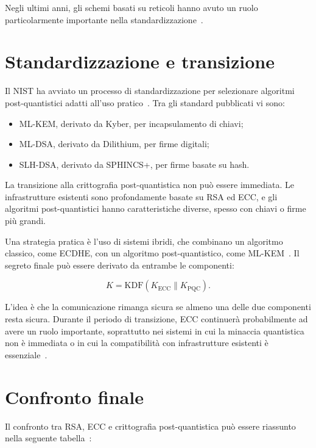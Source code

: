 \documentclass[12pt,a4paper,oneside]{report}
\begin{document}
Negli ultimi anni, gli schemi basati su reticoli hanno avuto un ruolo particolarmente importante nella standardizzazione~\cite{margara_pqc,fips_203,fips_204}.

\section{Standardizzazione e transizione}

Il NIST ha avviato un processo di standardizzazione per selezionare algoritmi post-quantistici adatti all'uso pratico~\cite{margara_pqc,fips_203,fips_204,fips_205}. Tra gli standard pubblicati vi sono:

\begin{itemize}
    \item ML-KEM, derivato da Kyber, per incapsulamento di chiavi;
    \item ML-DSA, derivato da Dilithium, per firme digitali;
    \item SLH-DSA, derivato da SPHINCS+, per firme basate su hash.
\end{itemize}

La transizione alla crittografia post-quantistica non può essere immediata. Le infrastrutture esistenti sono profondamente basate su RSA ed ECC, e gli algoritmi post-quantistici hanno caratteristiche diverse, spesso con chiavi o firme più grandi.

Una strategia pratica è l'uso di sistemi ibridi, che combinano un algoritmo classico, come ECDHE, con un algoritmo post-quantistico, come ML-KEM~\cite{margara_pqc,fips_203}. Il segreto finale può essere derivato da entrambe le componenti:

\[
K = \mathrm{KDF}(K_{\mathrm{ECC}} \parallel K_{\mathrm{PQC}}).
\]

L'idea è che la comunicazione rimanga sicura se almeno una delle due componenti resta sicura. Durante il periodo di transizione, ECC continuerà probabilmente ad avere un ruolo importante, soprattutto nei sistemi in cui la minaccia quantistica non è immediata o in cui la compatibilità con infrastrutture esistenti è essenziale~\cite{margara_pqc,fips_203}.

\section{Confronto finale}

Il confronto tra RSA, ECC e crittografia post-quantistica può essere riassunto nella seguente tabella~\cite{margara_rsa,margara_ec,margara_pqc,nist_sp800_57}:
\end{document}
